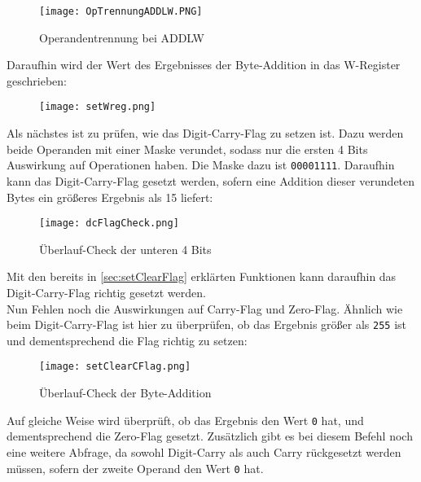 \documentclass[
10pt, %
a4paper, %
oneside, %
headinclude,footinclude, %
BCOR5mm, %
]{scrartcl}
\begin{document}
			\begin{figure}[h]
				\begin{center}
					\texttt{[image: OpTrennungADDLW.PNG]}
					\caption{Operandentrennung bei ADDLW}
				\end{center}
			\end{figure}
		
			Daraufhin wird der Wert des Ergebnisses der Byte-Addition in das W-Register geschrieben:
			
			\begin{figure}[h]
				\begin{center}
					\texttt{[image: setWreg.png]}
				\end{center}
			\end{figure}
		
			
			Als nächstes ist zu prüfen, wie das Digit-Carry-Flag zu setzen ist. Dazu werden beide Operanden mit einer Maske verundet, sodass nur die ersten 4 Bits Auswirkung auf Operationen haben.  Die Maske dazu ist \texttt{00001111}. Daraufhin kann das Digit-Carry-Flag gesetzt werden, sofern eine Addition dieser verundeten Bytes ein größeres Ergebnis als 15 liefert:
			
			\begin{figure}[h]
				\begin{center}
					\texttt{[image: dcFlagCheck.png]}
					\caption{Überlauf-Check der unteren 4 Bits}
				\end{center}
			\end{figure}
		
			Mit den bereits in \ref{sec:setClearFlag} erklärten Funktionen kann daraufhin das Digit-Carry-Flag richtig gesetzt werden. \\
			Nun Fehlen noch die Auswirkungen auf Carry-Flag und Zero-Flag.
			Ähnlich wie beim Digit-Carry-Flag ist hier zu überprüfen, ob das Ergebnis größer als \texttt{255} ist und dementsprechend die Flag richtig zu setzen:
			
			\begin{figure}[h]
				\begin{center}
					\texttt{[image: setClearCFlag.png]}
					\caption{Überlauf-Check der Byte-Addition}
				\end{center}
			\end{figure}
		
			Auf gleiche Weise wird überprüft, ob das Ergebnis den Wert \texttt{0} hat, und dementsprechend die Zero-Flag gesetzt. Zusätzlich gibt es bei diesem Befehl noch eine weitere Abfrage, da sowohl Digit-Carry als auch Carry rückgesetzt werden müssen, sofern der zweite Operand den Wert \texttt{0} hat.
			
\end{document}
